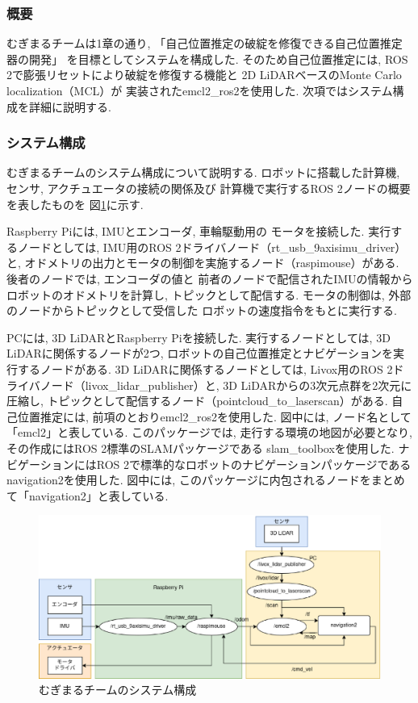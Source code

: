 \subsubsection{概要}
むぎまるチームは1章の通り, 「自己位置推定の破綻を修復できる自己位置推定器の開発」
を目標としてシステムを構成した. 
そのため自己位置推定には, 
ROS 2で膨張リセット\cite{ueda2004iros}により破綻を修復する機能と
2D LiDARベースのMonte Carlo localization（MCL）\cite{fox1999etal}が
実装されたemcl2\_ros2\cite{emcl2_ros2}を使用した. 
次項ではシステム構成を詳細に説明する. 
\subsubsection{システム構成}
むぎまるチームのシステム構成について説明する. 
ロボットに搭載した計算機, センサ, アクチュエータの接続の関係及び
計算機で実行するROS 2ノードの概要を表したものを
図\ref{fig:mugimaru_system}に示す. 

Raspberry Piには, IMUとエンコーダ, 車輪駆動用の
モータを接続した. 
実行するノードとしては, IMU用のROS 2ドライバノード（rt\_usb\_9axisimu\_driver）と, 
オドメトリの出力とモータの制御を実施するノード（raspimouse）がある. 
後者のノードでは, エンコーダの値と
前者のノードで配信されたIMUの情報からロボットのオドメトリを計算し, 
トピックとして配信する. 
モータの制御は, 外部のノードからトピックとして受信した
ロボットの速度指令をもとに実行する. 

PCには, 3D LiDARとRaspberry Piを接続した. 
実行するノードとしては, 3D LiDARに関係するノードが2つ, 
ロボットの自己位置推定とナビゲーションを実行するノードがある. 
3D LiDARに関係するノードとしては, Livox用のROS 2ドライバノード（livox\_lidar\_publisher）と, 
3D LiDARからの3次元点群を2次元に圧縮し, 
トピックとして配信するノード（pointcloud\_to\_laserscan）がある. 
自己位置推定には, 前項のとおりemcl2\_ros2を使用した. 
図中には, ノード名として「emcl2」と表している. 
このパッケージでは, 走行する環境の地図が必要となり, 
その作成にはROS 2標準のSLAMパッケージである
slam\_toolbox\cite{slam_toolbox}を使用した. 
ナビゲーションにはROS 2で標準的なロボットのナビゲーションパッケージである
navigation2\cite{nav2}を使用した. 
図中には, このパッケージに内包されるノードをまとめて「navigation2」と表している. 

\begin{figure}[h]
  \begin{center}
    \includegraphics[width=1.0\linewidth]{figs/mugimaru_system_2024.eps}
    \caption{むぎまるチームのシステム構成}
    \label{fig:mugimaru_system}
  \end{center}
\end{figure}

